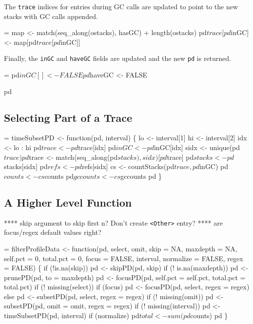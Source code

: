 \documentclass[11pt]{article}
\begin{document}
The \Verb!trace! indices for entries during GC calls are updated
to point to the new stacks with GC calls appended.
\begin{nwchunk}
=
 map <- match(seq_along(ostacks), hasGC) + length(ostacks)
 pd$trace[pd$inGC] <- map[pd$trace[pd$inGC]]
 
\end{nwchunk}

Finally, the \Verb!inGC! and \Verb?haveGC? fields are updated and the new
\Verb!pd! is returned.
\begin{nwchunk}
=
 pd$inGC[] <- FALSE
 pd$haveGC <- FALSE
 
 pd
\end{nwchunk}


\subsection{Selecting Part of a Trace}
\begin{nwchunk}
=
 timeSubsetPD <- function(pd, interval) \{
     lo <- interval[1]
     hi <- interval[2]
     idx <- lo : hi
     pd$trace <- pd$trace[idx]
     pd$inGC <- pd$inGC[idx]
     sidx <- unique(pd$trace)
     pd$trace <- match(seq_along(pd$stacks), sidx)[pd$trace]
     pd$stacks <- pd$stacks[sidx]
     pd$refs <- pd$refs[sidx]
     cs <- countStacks(pd$trace,pd$inGC)
     pd$counts <- cs$counts
     pd$gccounts <- cs$gccounts
     pd
 \}
\end{nwchunk}

\subsection{A Higher Level Function}
**** skip argument to skip first n? Don't create \Verb!<Other>! entry?
**** are focus/regex default values right?
\begin{nwchunk}
=
 filterProfileData <- function(pd, select, omit,
                               skip = NA,
                               maxdepth = NA,
                               self.pct = 0, total.pct = 0,
                               focus = FALSE,
                               interval,
                               normalize = FALSE,
                               regex = FALSE) \{
     if (!is.na(skip))
         pd <- skipPD(pd, skip)
     if (! is.na(maxdepth))
         pd <- prunePD(pd, to = maxdepth)
     pd <- focusPD(pd, self.pct = self.pct, total.pct = total.pct)
     if (! missing(select))
         if (focus)
             pd <- focusPD(pd, select, regex = regex)
         else
             pd <- subsetPD(pd, select, regex = regex)
     if (! missing(omit))
         pd <- subsetPD(pd, omit = omit, regex = regex)
     if (! missing(interval))
         pd <- timeSubsetPD(pd, interval)
     if (normalize)
         pd$total <- sum(pd$counts)
     pd
 \}
\end{nwchunk}
\end{document}
